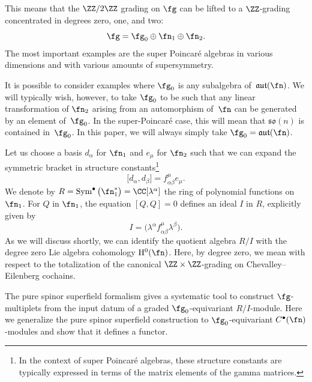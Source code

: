 \documentclass[10pt,a4paper]{amsart}
\numberwithin{equation}{section}
\def\lie#1{\ensuremath{\mathfrak{#1}}}
\def\aut{\ensuremath{\lie{aut}}}
\def\so{\lie{so}}
\DeclareMathOperator{\Sym}{Sym}
\begin{document}
This means that the $\ZZ/2\ZZ$ grading on $\fg$ can be lifted to a $\ZZ$-grading concentrated in degrees zero, one, and two:
\begin{equation*}
\fg = \fg_0 \oplus \fn_1 \oplus \fn_2.
\end{equation*}
The most important examples are the super Poincar\'e algebras in various dimensions and with various amounts of supersymmetry.

It is possible to consider examples where $\fg_0$ is any subalgebra of~$\aut(\fn)$. We will typically wish, however, to take $\fg_0$ to
be such that any linear transformation of $\fn_2$ arising from an automorphism of~$\fn$ can be generated by an element of~$\fg_0$.
In the super-Poincar\'e case, this will mean that $\so(n)$ is contained in~$\fg_0$. In this paper, we will always simply take $\fg_0 = \aut(\fn)$.

Let us choose a basis $d_\alpha$ for $\fn_1$ and $e_\mu$ for $\fn_2$ such that we can expand the symmetric bracket in structure constants\footnote{In the context of super Poincar\'e algebras, these structure constants are typically expressed in terms of the matrix elements of the gamma matrices.}
\begin{equation*}
\big[d_\alpha , d_\beta \big] = f^\mu_{\alpha \beta} e_\mu .
\end{equation*}
We denote by $R = \Sym^\bullet\big(\fn_1^*\big) = \CC[\lambda^\alpha]$ the ring of polynomial functions on $\fn_1$. For $Q$ in $\fn_1$, the equation $[Q,Q] = 0$ defines an ideal $I$ in $R$, explicitly given by
\begin{equation*}
I = \big(\lambda^\alpha f^\mu_{\alpha \beta} \lambda^\beta \big) .
\end{equation*}
As we will discuss shortly, we can identify the quotient algebra $R/I$ with the degree zero Lie algebra cohomology $\mathrm H^0(\fn)$. Here, by degree zero, we mean with respect to the totalization of the canonical $\ZZ \times \ZZ$-grading on Chevalley--Eilenberg cochains.

The pure spinor superfield formalism gives a systematic tool to construct $\fg$-multiplets from the input datum of a graded $\fg_0$-equivariant $R/I$-module. Here we generalize the pure spinor superfield construction to $\fg_0$-equivariant $C^\bullet(\fn)$-modules and show that it defines a functor.
\end{document}
